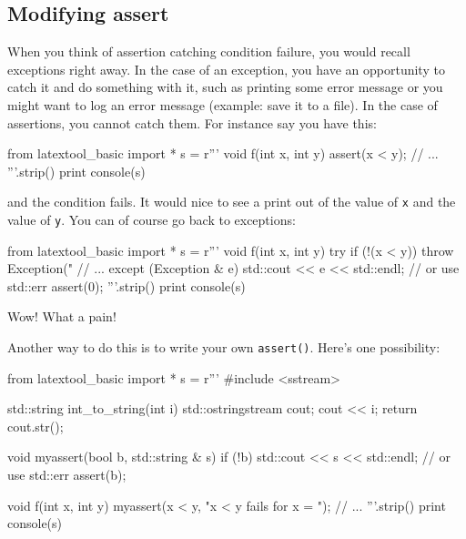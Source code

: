 \subsection{Modifying assert}

When you think of assertion catching condition failure, 
you would recall exceptions right away.
In the case of an exception, you have an opportunity to 
catch it and do something with it, such as 
printing some error message or you might want to log
an error message (example: save it to a file).
In the case of assertions, you cannot catch them.
For instance say you have this:
\begin{python}
from latextool_basic import *
s = r'''
void f(int x, int y)
{
    assert(x < y);
    // ... 
}
'''.strip()
print console(s)
\end{python}
and the condition fails.
It would nice to see a print out of the value of \verb!x!
and the value of \verb!y!.
You can of course go back to exceptions:
\begin{python}
from latextool_basic import *
s = r'''
void f(int x, int y)
{
    try
    {
        if (!(x < y)) throw Exception("%
        // ...
    }
    except (Exception & e)
    {
        std::cout << e << std::endl; // or use std::err
        assert(0);
    }
}
'''.strip()
print console(s)
\end{python}
Wow! What a pain!

Another way to do this is to write your own \verb!assert()!.
Here's one possibility:
\begin{python}
from latextool_basic import *
s = r'''
#include <sstream>

std::string int_to_string(int i)
{
    std::ostringstream cout;
    cout << i;
    return cout.str();
}

void myassert(bool b, std::string & s)
{
    if (!b) std::cout << s << std::endl; // or use std::err
    assert(b);
}

void f(int x, int y)
{
    myassert(x < y, "x < y fails for x = ");
    // ... 
}
'''.strip()
print console(s)
\end{python}
